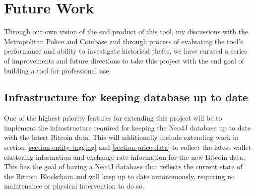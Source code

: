 \section{Future Work}
Through our own vision of the end product of this tool, my discussions with the Metropolitan Police and Coinbase and through process of evaluating the tool's performance and ability to investigate historical thefts, we have curated a series of improvements and future directions to take this project with the end goal of building a tool for professional use. 

\subsection{Infrastructure for keeping database up to date}
One of the highest priority features for extending this project will be to implement the infrastructure required for keeping the Neo4J database up to date with the latest Bitcoin data. This will additionally include extending work in section \ref{section-entity-tagging} and \ref{section-price-data} to collect the latest wallet clustering information and exchange rate information for the new Bitcoin data. This has the goal of having a Neo4J database that reflects the current state of the Bitcoin Blockchain and will keep up to date autonomously, requiring no maintenance or physical intervention to do so. 


